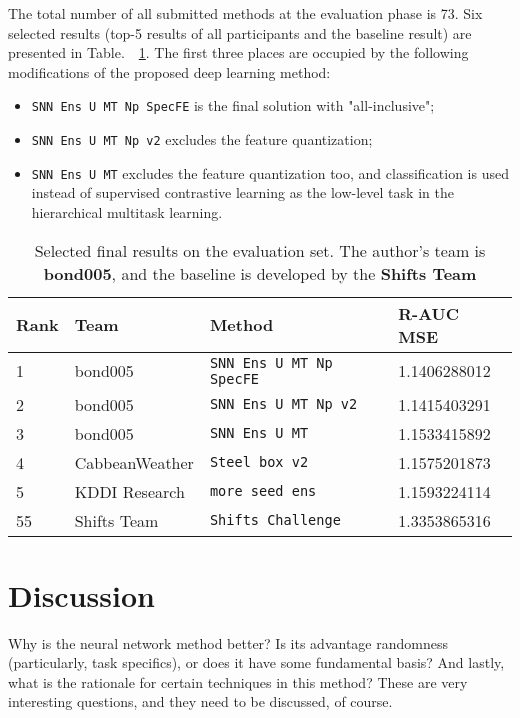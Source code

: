 \documentclass{article}
\begin{document}
The total number of all submitted methods at the evaluation phase is 73. Six selected results (top-5 results of all participants and the baseline result) are presented in Table.~~\ref{tab:evalset-results}. The first three places are occupied by the following modifications of the proposed deep learning method:

\begin{itemize}
    \item \verb+SNN Ens U MT Np SpecFE+ is the final solution with "all-inclusive";
    \item \verb+SNN Ens U MT Np v2+ excludes the feature quantization;
    \item \verb+SNN Ens U MT+ excludes the feature quantization too, and classification is used instead of supervised contrastive learning as the low-level task in the hierarchical multitask learning.
\end{itemize}

\begin{table}[h!]
  \caption{Selected final results on the evaluation set. The author's team is \textbf{bond005}, and the baseline is developed by the \textbf{Shifts Team}}
  \label{tab:evalset-results}
  \centering
  \begin{tabular}{llll}
    \toprule
    Rank & Team    & Method                        & R-AUC MSE     \\
    \midrule
    1    & bond005 & \verb+SNN Ens U MT Np SpecFE+ & 1.1406288012  \\
    2    & bond005 & \verb+SNN Ens U MT Np v2+     & 1.1415403291  \\
    3    & bond005 & \verb+SNN Ens U MT+           & 1.1533415892  \\
    4    & CabbeanWeather & \verb+Steel box v2+    & 1.1575201873  \\
    5    & KDDI Research & \verb+more seed ens+    & 1.1593224114  \\
    55   & Shifts Team & \verb+Shifts Challenge+   & 1.3353865316  \\
    \bottomrule
  \end{tabular}
\end{table}

\section{Discussion}
\label{discussion}

Why is the neural network method better? Is its advantage randomness (particularly, task specifics), or does it have some fundamental basis? And lastly, what is the rationale for certain techniques in this method? These are very interesting questions, and they need to be discussed, of course.
\end{document}
